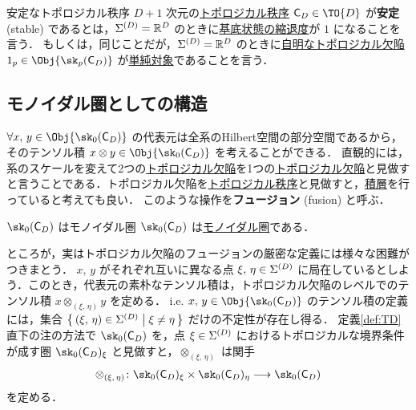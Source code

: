 \documentclass[TQFT_main]{subfiles}
\begin{document}
\begin{mydefph}[label=def:stableTO]{安定なトポロジカル秩序}
    $D+1$ 次元の\hyperref[def:quantum-phase]{トポロジカル秩序} $\mathsf{C}_D \in \TO{D}$ が\textbf{安定} (stable) であるとは，$\Sigma^{(D)} = \mathbb{R}^D$ のときに\hyperref[def:gapped]{基底状態の縮退度}が $1$ になることを言う．
    もしくは，同じことだが，$\Sigma^{(D)} = \mathbb{R}^D$ のときに\hyperref[def:trivialTO]{自明なトポロジカル欠陥} $1_p \in \Obj{\sk_p (\mathsf{C}_D)}$ が\hyperref[def:semisimple-cat]{単純対象}であることを言う．
\end{mydefph}

\subsection{モノイダル圏としての構造}

$\forall x,\, y \in \Obj{\sk_0(\mathsf{C}_D)}$ の代表元は全系のHilbert空間の部分空間であるから，そのテンソル積 $x \otimes y \in \Obj{\sk_0(\mathsf{C}_D)}$ を考えることができる．
直観的には，系のスケールを変えて2つの\hyperref[def:TD]{トポロジカル欠陥}を1つの\hyperref[def:TD]{トポロジカル欠陥}と見做すと言うことである．トポロジカル欠陥を\hyperref[def:quantum-phase]{トポロジカル秩序}と見做すと，\hyperref[def:stacking]{積層}を行っていると考えても良い．
このような操作を\textbf{フュージョン} (fusion) と呼ぶ．

\begin{mypropph}[label=prop:sk0-category]{$\sk_0(\mathsf{C}_D)$ はモノイダル圏}
    $\sk_0(\mathsf{C}_D)$ は\hyperref[redef:monoidal-category]{モノイダル圏}である．
\end{mypropph}

ところが，実はトポロジカル欠陥のフュージョンの厳密な定義には様々な困難がつきまとう．
$x,\, y$ がそれぞれ互いに異なる点 $\xi,\, \eta \in \Sigma^{(D)}$ に局在しているとしよう．このとき，代表元の素朴なテンソル積は，トポロジカル欠陥のレベルでのテンソル積 $x \otimes_{(\xi,\, \eta)} y$ を定める．
i.e. $x,\, y \in \Obj{\sk_0(\mathsf{C}_D)}$ のテンソル積の定義には，集合 $\bigl\{\, (\xi,\, \eta) \in \Sigma^{(D)} \bigm| \xi \neq \eta \,\bigr\}$ だけの不定性が存在し得る．
定義\ref{def:TD}直下の注の方法で $\sk_0(\mathsf{C}_D)$ を，点 $\xi \in \Sigma^{(D)}$ におけるトポロジカルな境界条件が成す圏 $\sk_0(\mathsf{C}_D)_\xi$ と見做すと，$\otimes_{(\xi,\, \eta)}$ は関手
\begin{align}
    \otimes_{(\xi,\, \eta)} \colon \sk_0(\mathsf{C}_D)_\xi \times \sk_0(\mathsf{C}_D)_\eta \lto \sk_0(\mathsf{C}_D)
\end{align}
を定める．
\end{document}
